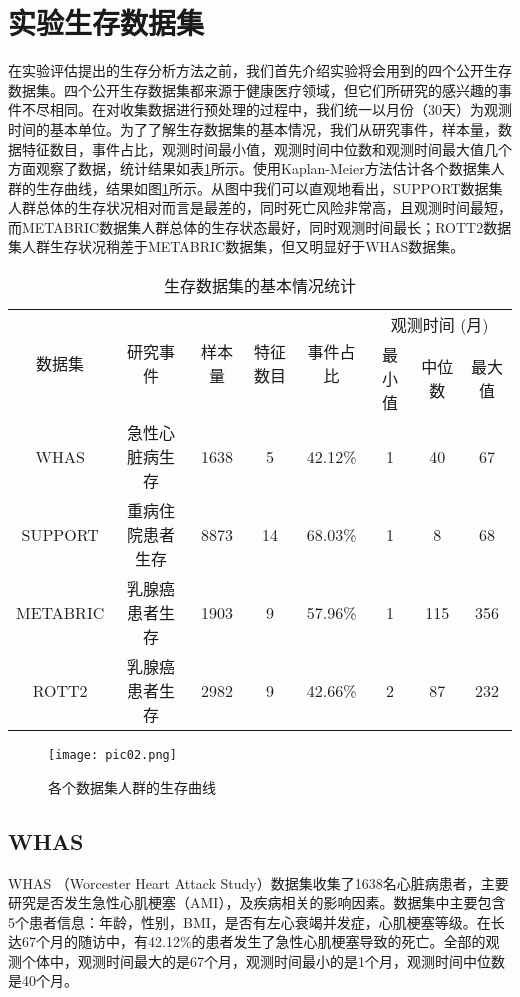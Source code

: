 \section{实验生存数据集}

在实验评估提出的生存分析方法之前，我们首先介绍实验将会用到的四个公开生存数据集。四个公开生存数据集都来源于健康医疗领域，但它们所研究的感兴趣的事件不尽相同。在对收集数据进行预处理的过程中，我们统一以月份（30天）为观测时间的基本单位。为了了解生存数据集的基本情况，我们从研究事件，样本量，数据特征数目，事件占比，观测时间最小值，观测时间中位数和观测时间最大值几个方面观察了数据，统计结果如表\ref{table01}所示。使用Kaplan-Meier方法估计各个数据集人群的生存曲线，结果如图\ref{pic02}所示。从图中我们可以直观地看出，SUPPORT数据集人群总体的生存状况相对而言是最差的，同时死亡风险非常高，且观测时间最短，而METABRIC数据集人群总体的生存状态最好，同时观测时间最长；ROTT2数据集人群生存状况稍差于METABRIC数据集，但又明显好于WHAS数据集。

\begin{table}[h]
\caption{生存数据集的基本情况统计}
\begin{tabular}{cccccccc}
\toprule
\multirow{2}{*}{数据集} & \multirow{2}{*}{研究事件} & \multirow{2}{*}{样本量} & \multirow{2}{*}{特征数目} & \multirow{2}{*}{事件占比} & \multicolumn{3}{c}{观测时间 (月)} \\ \cline{6-8} 
&  &  &  &  & 最小值 & 中位数 & 最大值 \\ 
\midrule
WHAS & 急性心脏病生存 & 1638 & 5 & 42.12\% & 1 & 40 & 67 \\
SUPPORT & 重病住院患者生存 & 8873 & 14 & 68.03\% & 1 & 8 & 68 \\
METABRIC & 乳腺癌患者生存 & 1903 & 9 & 57.96\% & 1 & 115 & 356 \\
ROTT2 & 乳腺癌患者生存 & 2982 & 9 & 42.66\% & 2 & 87 & 232 \\
\bottomrule
\end{tabular}
\label{table01}
\end{table}

\begin{figure}[h]
\texttt{[image: pic02.png]}
\caption{各个数据集人群的生存曲线}
\label{pic02}
\end{figure}

\subsection{WHAS}

WHAS （Worcester Heart Attack Study）数据集收集了1638名心脏病患者，主要研究是否发生急性心肌梗塞（AMI），及疾病相关的影响因素。数据集中主要包含5个患者信息：年龄，性别，BMI，是否有左心衰竭并发症，心肌梗塞等级。在长达67个月的随访中，有42.12\%的患者发生了急性心肌梗塞导致的死亡。全部的观测个体中，观测时间最大的是67个月，观测时间最小的是1个月，观测时间中位数是40个月。

